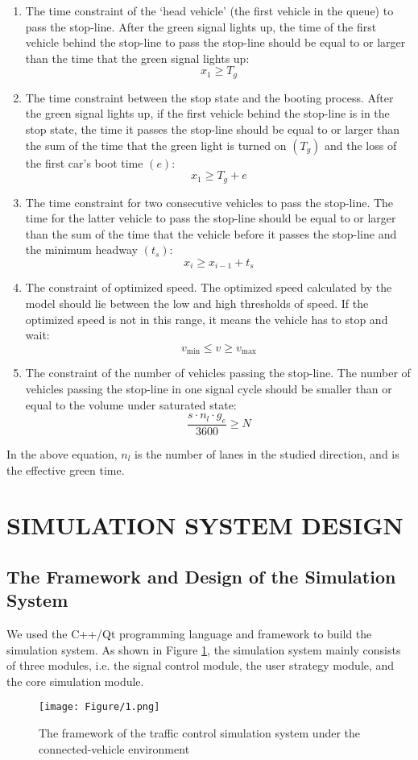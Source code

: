 \documentclass[10.5pt,compsoc]{TsT}
\theoremstyle{mystyle}
\renewcommand{\labelenumi}{(\arabic{enumi})}
\begin{document}
{\begin{enumerate}
\def\labelenumi{\alph{enumi})}
\item
  The time constraint of the `head vehicle' (the first vehicle in the
  queue) to pass the stop-line. After the green signal lights up, the
  time of the first vehicle behind the stop-line to pass the stop-line
  should be equal to or larger than the time that the green signal
  lights up:
$$x_1 \ge T_g$$
\item
  The time constraint between the stop state and the booting process.
  After the green signal lights up, if the first vehicle behind the
  stop-line is in the stop state, the time it passes the stop-line
  should be equal to or larger than the sum of the time that the green
  light is turned on $(T_g)$ and the loss of the first car's boot time $(e)$:
$$x_1 \ge T_g +e$$

\item
  The time constraint for two consecutive vehicles to pass the
  stop-line. The time for the latter vehicle to pass the stop-line
  should be equal to or larger than the sum of the time that the vehicle
  before it passes the stop-line and the minimum headway $(t_s)$:
$$x_i \ge x_{i-1} + t_s$$
\item
  The constraint of optimized speed. The optimized speed calculated by
  the model should lie between the low and high thresholds of speed. If
  the optimized speed is not in this range, it means the vehicle has to
  stop and wait:
$$ v_{\min} \le v \ge v_{\max}$$
\item
  The constraint of the number of vehicles passing the stop-line. The
  number of vehicles passing the stop-line in one signal cycle should be
  smaller than or equal to the volume under saturated state:
$$ \frac{s\cdot n_l \cdot g_e}{3600} \ge N$$
\end{enumerate}

In the above equation, $n_l$ is the number of lanes in the studied direction,
and is the effective green time.

\section{SIMULATION SYSTEM DESIGN}
\noindent
\subsection{The Framework and Design of the Simulation System}
\noindent
We used the C++/Qt programming language and framework to build the
simulation system. As shown in Figure \ref{Figure 1}, the simulation system mainly
consists of three modules, i.e. the signal control module, the user
strategy module, and the core simulation module.
\begin{figure}[H]
\centering
\texttt{[image: Figure/1.png]}
\caption{The framework of the traffic control simulation system under
the connected-vehicle environment}
\label{Figure 1}
\end{figure}

}
\end{document}
